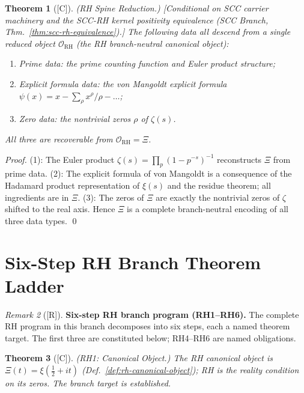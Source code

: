 \documentclass[12pt,oneside]{amsbook}
\theoremstyle{plain}
\newtheorem{theorem}{Theorem}[section]
\theoremstyle{definition}
\theoremstyle{remark}
\newtheorem{remark}[theorem]{Remark}
\newcommand{\status}[1]{\textup{[#1]}}
\begin{document}
\begin{theorem}[\status{C}]\label{thm:rh-spine-reduction}
\textup{(RH Spine Reduction.)}
\textup{[Conditional on SCC carrier machinery and the
SCC-RH kernel positivity equivalence (SCC Branch,
Thm.~\ref{thm:scc-rh-equivalence}).]}
The following data all descend from a single reduced object
$\mathcal{O}_{\mathrm{RH}}$ (the RH branch-neutral canonical object):
\begin{enumerate}[label=\textup{(\arabic*)}]
 \item \emph{Prime data}: the prime counting function and
 Euler product structure;
 \item \emph{Explicit formula data}: the von Mangoldt explicit
 formula $\psi(x) = x - \sum_\rho x^\rho/\rho - \ldots$;
 \item \emph{Zero data}: the nontrivial zeros $\rho$ of $\zeta(s)$.
\end{enumerate}
All three are recoverable from $\mathcal{O}_{\mathrm{RH}} = \Xi$.
\end{theorem}

\begin{proof}
(1): The Euler product $\zeta(s) = \prod_p (1-p^{-s})^{-1}$
reconstructs $\Xi$ from prime data.
(2): The explicit formula of von Mangoldt is a consequence of
the Hadamard product representation of $\xi(s)$ and the residue
theorem; all ingredients are in $\Xi$.
(3): The zeros of $\Xi$ are exactly the nontrivial zeros of $\zeta$
shifted to the real axis.
Hence $\Xi$ is a complete branch-neutral encoding of all three
data types. \qed
\end{proof}

\section{Six-Step RH Branch Theorem Ladder}
\label{sec:rh-ladder}

\begin{remark}[\status{R}]
\textbf{Six-step RH branch program (RH1--RH6).}
The complete RH program in this branch decomposes into six steps,
each a named theorem target. The first three are constituted
below; RH4--RH6 are named obligations.
\end{remark}

\begin{theorem}[\status{C}]\label{thm:RH1}
\textup{(RH1: Canonical Object.)}
The RH canonical object is $\Xi(t) = \xi(\tfrac{1}{2}+it)$
(Def.~\ref{def:rh-canonical-object}); RH is the reality condition
on its zeros. The branch target is established.
\end{theorem}
\end{document}
